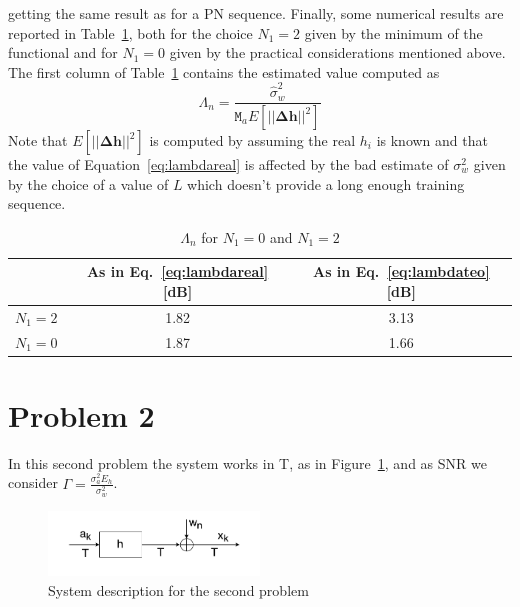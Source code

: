 \documentclass[10pt]{article}
\newcommand{\M} {\mathtt{M}}
\begin{document}
getting the same result as for a PN sequence.
Finally, some numerical results are reported in Table~\ref{table:lambda}, both for the choice $N_1 = 2$ given by the minimum of the functional and for $N_1 = 0$ given by the practical considerations mentioned above. 
The first column of Table~\ref{table:lambda} contains the estimated value computed as
\begin{equation}
	\Lambda_n = \frac{\hat{\sigma}_w^2}{\M_a E[||\mathbf{\Delta h}||^2]}
	\label{eq:lambdareal}
\end{equation}
Note that $E[||\mathbf{\Delta h}||^2]$ is computed by assuming the real $h_i$ is known and that the value of Equation~\eqref{eq:lambdareal} is affected by the bad estimate of $\sigma_w^2$ given by the choice of a value of $L$ which doesn't provide a long enough training sequence.

\begin{table}[h!]
	\centering
	\begin{tabular}{c|c|c}
				&	As in Eq.~\eqref{eq:lambdareal} [dB]	& As in Eq.~\eqref{eq:lambdateo} [dB]  \\ \hline
	$N_1 = 2$	&	1.82							& 3.13 \\
	$N_1 = 0$	&	1.87							& 1.66 \\
	\end{tabular}
	\caption{$\Lambda_n$ for $N_1 = 0$ and $N_1 = 2$}
	\label{table:lambda}
\end{table}

\clearpage


\section*{Problem 2}

In this second problem the system works in T, as in Figure~\ref{fig:channelt}, and as SNR we consider $\Gamma = \frac{\sigma_a^2 E_h}{\sigma_w^2}$. 

\begin{figure}[h!]
	\centering
	\includegraphics[width=0.5\textwidth]{channel_t}
	\caption{System description for the second problem}
	\label{fig:channelt}
\end{figure}
\end{document}
